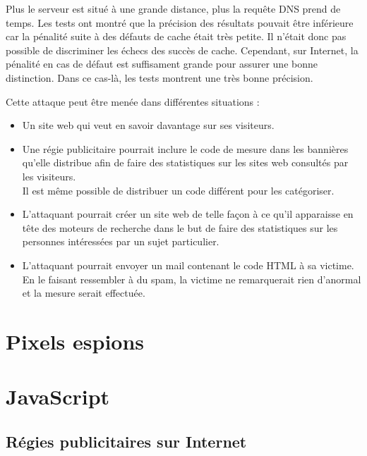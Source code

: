Plus le serveur est situé à une grande distance, plus la requête DNS prend de temps. Les tests ont montré que la précision des résultats pouvait être inférieure car la pénalité suite à des défauts de cache était très petite. Il n'était donc pas possible de discriminer les échecs des succès de cache. Cependant, sur Internet, la pénalité en cas de défaut est suffisament grande pour assurer une bonne distinction. Dans ce cas-là, les tests montrent une très bonne précision.
\newline


Cette attaque peut être menée dans différentes situations :
\begin{itemize}
  \item Un site web qui veut en savoir davantage sur ses visiteurs.
  \item Une régie publicitaire pourrait inclure le code de mesure dans les bannières qu'elle distribue afin de faire des statistiques sur les sites web consultés par les visiteurs.\\Il est même possible de distribuer un code différent pour les catégoriser.
  \item L'attaquant pourrait créer un site web de telle façon à ce qu'il apparaisse en tête des moteurs de recherche dans le but de faire des statistiques sur les personnes intéressées par un sujet particulier.
  \item L'attaquant pourrait envoyer un mail contenant le code HTML à sa victime.\\En le faisant ressembler à du spam, la victime ne remarquerait rien d'anormal et la mesure serait effectuée.
\end{itemize}



\section{Pixels espions}


\section{JavaScript}
	\subsection{Régies publicitaires sur Internet}
		
